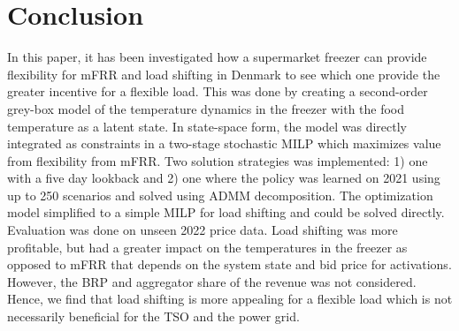 \section{Conclusion}\label{sec:conclusion}

In this paper, it has been investigated how a supermarket freezer can provide flexibility for mFRR and load shifting in Denmark to see which one provide the greater incentive for a flexible load. This was done by creating a second-order grey-box model of the temperature dynamics in the freezer with the food temperature as a latent state. In state-space form, the model was directly integrated as constraints in a two-stage stochastic MILP which maximizes value from flexibility from mFRR. Two solution strategies was implemented: 1) one with a five day lookback and 2) one where the policy was learned on 2021 using up to 250 scenarios and solved using ADMM decomposition. The optimization model simplified to a simple MILP for load shifting and could be solved directly. Evaluation was done on unseen 2022 price data. Load shifting was more profitable, but had a greater impact on the temperatures in the freezer as opposed to mFRR that depends on the system state and bid price for activations. However, the BRP and aggregator share of the revenue was not considered. Hence, we find that load shifting is more appealing for a flexible load which is not necessarily beneficial for the TSO and the power grid.
